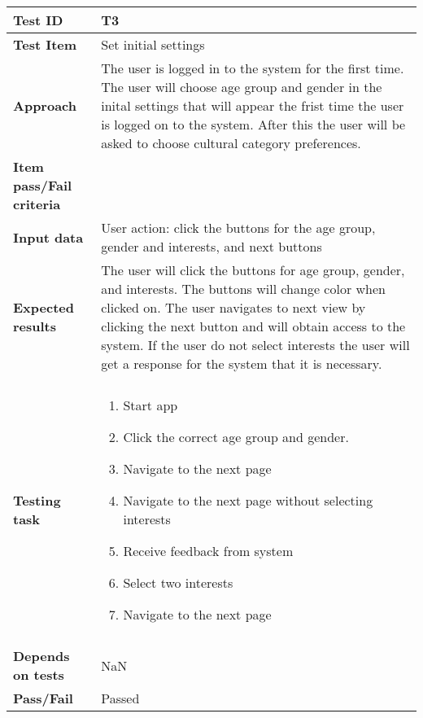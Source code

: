 \begin{appendices}
	\begin{table}[H]
		\centering
		\begin{tabular}{ | l | l |}			
			\hline
			\textbf{Test ID} & T3  \\ \hline
			\textbf{Test Item} & Set initial settings \\ \hline
			\textbf{Approach} & \begin{minipage}{5in}The user is logged in to the system for the first time. The user will choose age group and gender in the inital settings that will appear the frist time the user is logged on to the system. After this the user will be asked to choose cultural category preferences.  \end{minipage}\\ \hline
			\textbf{Item pass/Fail criteria} & \\ \hline
			\textbf{Input data} & \begin{minipage}{5in} User action: click the buttons for the age group, gender and interests, and next buttons  \end{minipage}\\ \hline
			\textbf{Expected results} & \begin{minipage}{5in}The user will click the buttons for age group, gender, and interests. The buttons will change color when clicked on. The user navigates to next view by clicking the next button and will obtain access to the system. If the user do not select interests the user will get a response for the system that it is necessary. \end{minipage}\\ \hline&\\[-3.8ex]
			\textbf{Testing task} & \begin{minipage}{5in}
			\begin{enumerate}[noitemsep]
				\item Start app
				\item Click the correct age group and gender.
				\item Navigate to the next page
				\item Navigate to the next page without selecting interests
				\item Receive feedback from system
				\item Select two interests
				\item Navigate to the next page
			\end{enumerate}\end{minipage}
			\\ &\\[-3.8ex]\hline
			\textbf{Depends on tests} & NaN \\ \hline	
			\textbf{Pass/Fail} & Passed \\\hline				
		\end{tabular}


\end{table}
\end{appendices}
